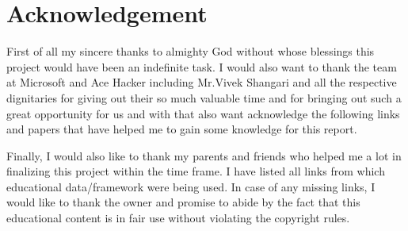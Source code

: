 \documentclass{article}
\begin{document}
\section{Acknowledgement}
First of all my sincere thanks to almighty God without whose blessings this project would have been an indefinite task. I would also want to thank the team at Microsoft and Ace Hacker including Mr.Vivek Shangari and all the respective dignitaries for giving out their so much valuable time and for bringing out such a great opportunity for us and with that also want acknowledge the following links and papers that have helped me to
gain some knowledge for this report. 

Finally, I would also like to thank my parents and friends who helped me a lot in finalizing this project within the time frame.
I have listed all links from which educational data/framework were being used. In case of any missing links, I would like to thank the owner and promise to abide by the fact that this educational content is in fair use without violating the copyright rules.
\end{document}
